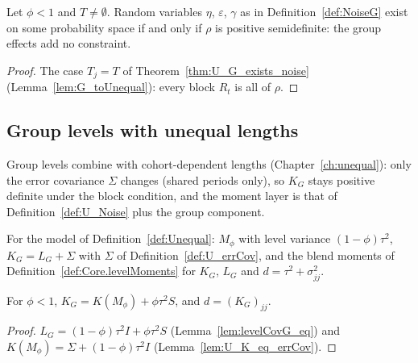 \begin{theorem}\label{thm:G_exists_noise}
  \leanok
  Let $\phi < 1$ and $T \ne \emptyset$. Random variables $\eta$, $\varepsilon$,
  $\gamma$ as in Definition~\ref{def:NoiseG} exist on some probability space if
  and only if $\rho$ is positive semidefinite: the group effects add no
  constraint.
\end{theorem}
\begin{proof}
  \leanok
  The case $T_j = T$ of Theorem~\ref{thm:U_G_exists_noise}
  (Lemma~\ref{lem:G_toUnequal}): every block $R_t$ is all of $\rho$.
\end{proof}

\subsection*{Group levels with unequal lengths}

Group levels combine with cohort-dependent lengths (Chapter~\ref{ch:unequal}):
only the error covariance $\Sigma$ changes (shared periods only), so $K_G$
stays positive definite under the block condition, and the moment layer is
that of Definition~\ref{def:U_Noise} plus the group component.

\begin{definition}\label{def:U_KG}
  \leanok
  For the model of Definition~\ref{def:Unequal}: $M_\phi$ with level variance
  $(1-\phi)\tau^2$, $K_G = L_G + \Sigma$ with $\Sigma$ of
  Definition~\ref{def:U_errCov}, and the blend moments of
  Definition~\ref{def:Core.levelMoments} for $K_G$, $L_G$ and
  $d = \tau^2 + \sigma^2_{jj}$.
\end{definition}

\begin{lemma}\label{lem:U_KG_eq}
  \leanok
  For $\phi < 1$, $K_G = K(M_\phi) + \phi\tau^2 S$, and $d = (K_G)_{jj}$.
\end{lemma}
\begin{proof}
  \leanok
  $L_G = (1-\phi)\tau^2 I + \phi\tau^2 S$ (Lemma~\ref{lem:levelCovG_eq}) and
  $K(M_\phi) = \Sigma + (1-\phi)\tau^2 I$ (Lemma~\ref{lem:U_K_eq_errCov}).
\end{proof}

